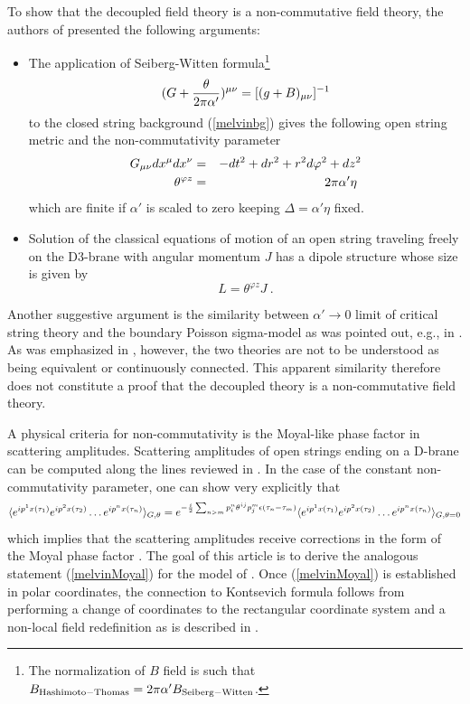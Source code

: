 \documentclass[12pt]{article}
\newcommand{\be}{\begin{equation}}
\newcommand{\ee}{\end{equation}}
\newcommand{\beq}{\begin{eqnarray}}
\newcommand{\eeq}{\end{eqnarray}}
\begin{document}
To show that the decoupled field theory is a non-commutative field
theory, the authors of \cite{Hashimoto:2004pb} presented the following
arguments:
%
\begin{itemize}
%
\item The application of Seiberg-Witten formula\footnote{The normalization of $B$ field is such that $B_{{\rm Hashimoto-Thomas}}= 2 \pi \alpha' B_{{\rm Seiberg-Witten}}$.} \cite{Seiberg:1999vs}
%
\be (G + {\theta \over 2 \pi \alpha'})^{\mu \nu} = [(g + B)_{\mu \nu}]^{-1}   \label{swmap} \ee
%
to the closed string background (\ref{melvinbg}) gives the following open string metric and the non-commutativity parameter
%
\beq G_{\mu \nu} dx^\mu dx^\nu &=& -dt^2 + dr^2 + r^2 d \varphi^2 + d
z^2 \cr \theta^{\varphi z} & = & 2 \pi \alpha' \eta \
 \label{openmetric} \eeq
%
which are finite if $\alpha'$ is scaled to zero keeping $\Delta = \alpha' \eta$ fixed.

\item Solution of the classical equations of motion of an open string traveling freely on the D3-brane with angular momentum $J$ has a dipole structure whose size is given by\cite{Hashimoto:2004pb}
%
\be L = \theta^{\varphi z} J \ . \ee

\end{itemize}

Another suggestive argument is the similarity between $\alpha'
\rightarrow 0$ limit of critical string theory and the boundary
Poisson sigma-model \cite{Cattaneo:1999fm} as was pointed out, e.g.,
in \cite{Baulieu:2001fi}. As was emphasized in \cite{Baulieu:2001fi},
however, the two theories are not to be understood as being equivalent
or continuously connected. This apparent similarity therefore does not
constitute a proof that the decoupled theory is a non-commutative
field theory.

A physical criteria for non-commutativity is the Moyal-like phase
factor in scattering amplitudes.  Scattering amplitudes of open
strings ending on a D-brane can be computed along the lines reviewed
in \cite{Hashimoto:1996bf}.  In the case of the constant
non-commutativity parameter, one can show very explicitly that
%
\be \langle e^{i p^1 x(\tau_1)} e^{i p^2 x(\tau_2)} \ldots e^{i p^n x(\tau_n)}\rangle_{G,\theta} = e^{-{i \over 2} \sum_{n > m} p_i^n \theta^{ij} p_j^m \epsilon(\tau_n-\tau_m)}
\langle e^{i p^1 x(\tau_1)} e^{i p^2 x(\tau_2)} \ldots e^{i p^n x(\tau_n)}\rangle_{G,\theta=0}\label{master}\ee
%
which implies that the scattering amplitudes receive corrections in
the form of the Moyal phase factor
\cite{Chu:1998qz,Schomerus:1999ug,Seiberg:1999vs}. The goal of this
article is to derive the analogous statement (\ref{melvinMoyal}) for
the model of \cite{Hashimoto:2004pb,Hashimoto:2005hy}. Once
(\ref{melvinMoyal}) is established in polar coordinates, the
connection to Kontsevich formula follows from performing a change of
coordinates to the rectangular coordinate system and a non-local field
redefinition as is described in
\cite{Cerchiai:2003yu,Hashimoto:2005hy}.
\end{document}
